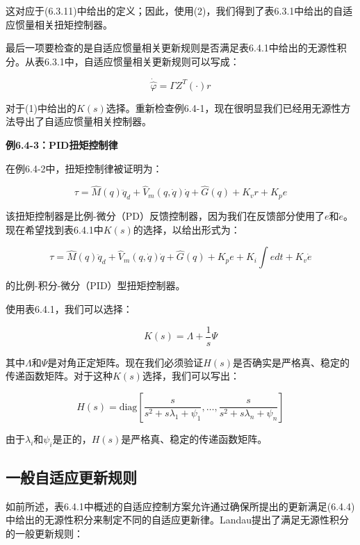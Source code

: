 \documentclass[12pt,a4paper]{ctexart}
\begin{document}
这对应于(6.3.11)中给出的定义；因此，使用(2)，我们得到了表6.3.1中给出的自适应惯量相关扭矩控制器。

最后一项要检查的是自适应惯量相关更新规则是否满足表6.4.1中给出的无源性积分。从表6.3.1中，自适应惯量相关更新规则可以写成：

\begin{equation}
\dot{\hat{\varphi}} = \Gamma Z^T(\cdot)r
\end{equation}

对于(1)中给出的$K(s)$选择。重新检查例6.4-1，现在很明显我们已经用无源性方法导出了自适应惯量相关控制器。

\textbf{例6.4-3：PID扭矩控制律}

在例6.4-2中，扭矩控制律被证明为：

\begin{equation}
\tau = \hat{M}(q)\ddot{q}_d + \hat{V}_m(q, \dot{q})\dot{q} + \hat{G}(q) + K_v r + K_p e
\end{equation}

该扭矩控制器是比例-微分（PD）反馈控制器，因为我们在反馈部分使用了$e$和$\dot{e}$。现在希望找到表6.4.1中$K(s)$的选择，以给出形式为：

\begin{equation}
\tau = \hat{M}(q)\ddot{q}_d + \hat{V}_m(q, \dot{q})\dot{q} + \hat{G}(q) + K_p e + K_i \int e dt + K_v \dot{e}
\end{equation}

的比例-积分-微分（PID）型扭矩控制器。

使用表6.4.1，我们可以选择：

\begin{equation}
K(s) = \Lambda + \frac{1}{s}\Psi
\end{equation}

其中$\Lambda$和$\Psi$是对角正定矩阵。现在我们必须验证$H(s)$是否确实是严格真、稳定的传递函数矩阵。对于这种$K(s)$选择，我们可以写出：

\begin{equation}
H(s) = \text{diag}\left[\frac{s}{s^2 + s\lambda_1 + \psi_1}, \ldots, \frac{s}{s^2 + s\lambda_n + \psi_n}\right]
\end{equation}

由于$\lambda_i$和$\psi_i$是正的，$H(s)$是严格真、稳定的传递函数矩阵。

\subsection*{一般自适应更新规则}

如前所述，表6.4.1中概述的自适应控制方案允许通过确保所提出的更新满足(6.4.4)中给出的无源性积分来制定不同的自适应更新律。Landau提出了满足无源性积分的一般更新规则：
\end{document}
